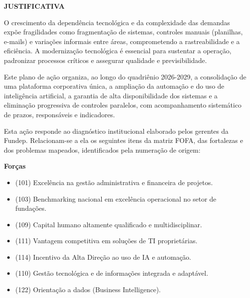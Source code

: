 \documentclass[12pt,a4paper]{article}
\newcommand{\secao}[1]{%
  \par\vspace{\dimexpr16pt-\parskip\relax}%
  {\noindent\bfseries\color{azulTitulo}\fontsize{13}{16}\selectfont #1}%
  \par\vspace{\dimexpr8pt-\parskip\relax}%
}
\begin{document}
\secao{JUSTIFICATIVA}

O crescimento da dependência tecnológica e da complexidade das demandas expõe fragilidades como fragmentação de sistemas, controles manuais (planilhas, e-mails) e variações informais entre áreas, comprometendo a rastreabilidade e a eficiência. A modernização tecnológica é essencial para sustentar a operação, padronizar processos críticos e assegurar qualidade e previsibilidade.

Este plano de ação organiza, ao longo do quadriênio 2026-2029, a consolidação de uma plataforma corporativa única, a ampliação da automação e do uso de inteligência artificial, a garantia de alta disponibilidade dos sistemas e a eliminação progressiva de controles paralelos, com acompanhamento sistemático de prazos, responsáveis e indicadores.

Esta ação responde ao diagnóstico institucional elaborado pelos gerentes da Fundep. Relacionam-se a ela os seguintes itens da matriz FOFA, das fortalezas e dos problemas mapeados, identificados pela numeração de origem:

\textbf{Forças}
\begin{itemize}[leftmargin=1.25cm,topsep=0pt,itemsep=2pt,parsep=0pt]
  \item (101) Excelência na gestão administrativa e financeira de projetos.
  \item (103) Benchmarking nacional em excelência operacional no setor de fundações.
  \item (109) Capital humano altamente qualificado e multidisciplinar.
  \item (111) Vantagem competitiva em soluções de TI proprietárias.
  \item (114) Incentivo da Alta Direção ao uso de IA e automação.
  \item (110) Gestão tecnológica e de informações integrada e adaptável.
  \item (122) Orientação a dados (Business Intelligence).
\end{itemize}
\end{document}
